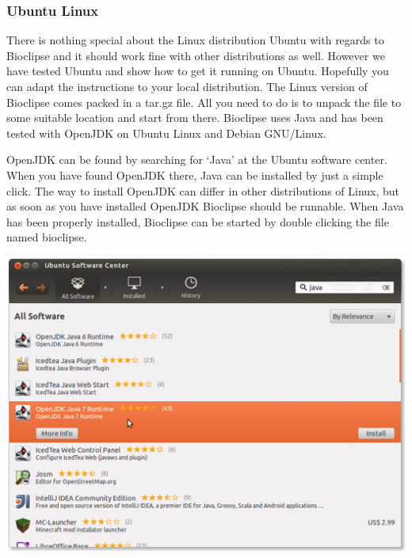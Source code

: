 \documentclass[a5paper, 10pt]{memoir}
\begin{document}
\begin{refsection}
\subsubsection{Ubuntu Linux}
There is nothing special about the Linux distribution Ubuntu with regards to
Bioclipse and it should work fine with other distributions as well. However we
have tested Ubuntu and show how to get it running on Ubuntu. Hopefully you can
adapt the instructions to your local distribution.
The Linux version of Bioclipse comes packed in a tar.gz file. All you need to
do is to unpack the file to some suitable location and start from there.
Bioclipse uses Java and has been tested with OpenJDK on Ubuntu Linux and Debian
GNU/Linux. 

OpenJDK can be found by searching for `Java' at the Ubuntu software center.
When you have found OpenJDK there, Java can be installed by just a simple
click. The way to install OpenJDK can differ in other distributions of Linux,
but as soon as you have installed OpenJDK Bioclipse should be runnable. When
Java has been properly installed, Bioclipse can be started by double clicking
the file named bioclipse.
\vfill
\begin{center}
\includegraphics[width=1\textwidth]{images/Java7onUbuntu.png}
\end{center}
\vfill\vfill


\end{refsection}
\end{document}
